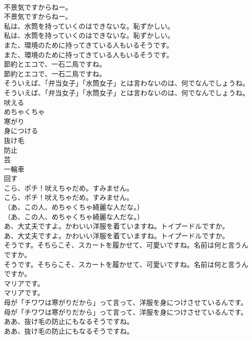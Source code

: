 \documentclass[8pt]{extreport}
\begin{document}
\begin{CJK}{UTF8}{min}
\\	不景気ですからねー。	
\\	不景気ですからねー。 
\\	私は、水筒を持っていくのはできないな。恥ずかしい。	
\\	私は、水筒を持っていくのはできないな。恥ずかしい。 
\\	また、環境のために持ってきている人もいるそうです。	
\\	また、環境のために持ってきている人もいるそうです。 
\\	節約とエコで、一石二鳥ですね。	
\\	節約とエコで、一石二鳥ですね。 
\\	そういえば、「弁当女子」「水筒女子」とは言わないのは、何でなんでしょうね。	
\\	そういえば、「弁当女子」「水筒女子」とは言わないのは、何でなんでしょうね。 
\\	吠える
\\	めちゃくちゃ
\\	寒がり
\\	身につける
\\	抜け毛
\\	防止
\\	芸
\\	一輪車
\\	回す
\\	こら、ポチ！吠えちゃだめ。すみません。	
\\	こら、ポチ！吠えちゃだめ。すみません。 
\\	（あ、この人、めちゃくちゃ綺麗な人だな。）	
\\	（あ、この人、めちゃくちゃ綺麗な人だな。） 
\\	あ、大丈夫ですよ。かわいい洋服を着ていますね。トイプードルですか。	
\\	あ、大丈夫ですよ。かわいい洋服を着ていますね。トイプードルですか。 
\\	そうです。そちらこそ、スカートを履かせて、可愛いですね。名前は何と言うんですか。	
\\	そうです。そちらこそ、スカートを履かせて、可愛いですね。名前は何と言うんですか。 
\\	マリアです。	
\\	マリアです。 
\\	母が「チワワは寒がりだから」って言って、洋服を身につけさせているんです。	
\\	母が「チワワは寒がりだから」って言って、洋服を身につけさせているんです。 
\\	ああ、抜け毛の防止にもなるそうですね。	
\\	ああ、抜け毛の防止にもなるそうですね。 

\end{CJK}
\end{document}
